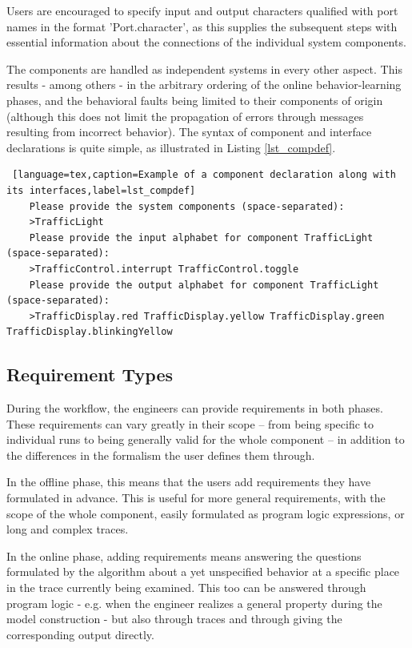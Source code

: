 Users are encouraged to specify input and output characters qualified with port names in the format '{\selectfont Port.character}', as this supplies the subsequent steps with essential information about the connections of the individual system components.

The components are handled as independent systems in every other aspect. This results - among others - in the arbitrary ordering of the online behavior-learning phases, and the behavioral faults being limited to their components of origin (although this does not limit the propagation of errors through messages resulting from incorrect behavior).
The syntax of component and interface declarations is quite simple, as illustrated in Listing \ref{lst_compdef}.

\bigskip
\begin{lstlisting} [language=tex,caption=Example of a component declaration along with its interfaces,label=lst_compdef]
	Please provide the system components (space-separated):
	>TrafficLight
	Please provide the input alphabet for component TrafficLight (space-separated):
	>TrafficControl.interrupt TrafficControl.toggle
	Please provide the output alphabet for component TrafficLight (space-separated):
	>TrafficDisplay.red TrafficDisplay.yellow TrafficDisplay.green TrafficDisplay.blinkingYellow
\end{lstlisting}

\subsection{Requirement Types} \label{subs_reqtypes}
During the workflow, the engineers can provide requirements in both phases. These requirements can vary greatly in their scope -- from being specific to individual runs to being generally valid for the whole component -- in addition to the differences in the formalism the user defines them through. 

In the offline phase, this means that the users add requirements they have formulated in advance. This is useful for more general requirements, with the scope of the whole component, easily formulated as program logic expressions, or long and complex traces.

In the online phase, adding requirements means answering the questions formulated by the algorithm about a yet unspecified behavior at a specific place in the trace currently being examined. This too can be answered through program logic - e.g. when the engineer realizes a general property during the model construction - but also through traces and through giving the corresponding output directly.

